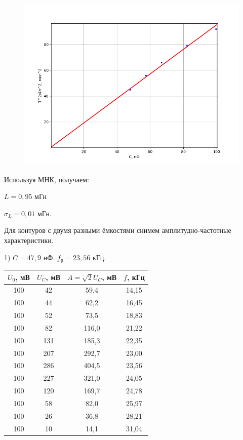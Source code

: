 \documentclass[a4paper,12pt]{article} %
\begin{document}
\begin{figure}[h!]
	\centering
	\includegraphics[scale=0.80]{Pictures/T(C).png}
\end{figure}
		
Используя МНК, получаем:

$L = 0,95$ мГн

$\sigma_L = 0,01$ мГн.
\newpage

Для контуров с двумя разными ёмкостями снимем амплитудно-частотные характеристики.

1) $C = 47,9$ нФ. $f_{\text{р}} = 23,56$ кГц.

\begin{table}[h!]
	\centering
	\begin{tabular}{|c|c|c|c|}
		\hline
		$U_0$, мВ & $U_C$, мВ & $A = \sqrt{2}U_C$, мВ & $f$, кГц \\ \hline
		100       & 42        & 59,4                  & 14,15   \\ \hline
		100       & 44        & 62,2                  & 16,45   \\ \hline
		100       & 52        & 73,5                  & 18,83   \\ \hline
		100       & 82        & 116,0                 & 21,22   \\ \hline
		100       & 131       & 185,3                 & 22,35   \\ \hline
		100       & 207       & 292,7                 & 23,00   \\ \hline
		100       & 286       & 404,5                 & 23,56   \\ \hline
		100       & 227       & 321,0                 & 24,05   \\ \hline
		100       & 120       & 169,7                 & 24,78   \\ \hline
		100       & 58        & 82,0                  & 25,97   \\ \hline
		100       & 26        & 36,8                  & 28,21   \\ \hline
		100       & 10        & 14,1                  & 31,04   \\ \hline
	\end{tabular}
\end{table}
\end{document}
